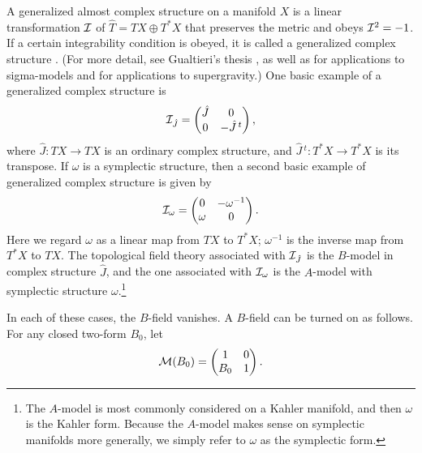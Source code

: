  A generalized
almost complex structure on a manifold $X$ is a linear
transformation ${\cal I}$ of $\widehat T=TX\oplus T^*X$ that
preserves the metric and obeys ${\cal I}^2=-1$.  If a certain
integrability condition is obeyed, it is called a generalized
complex structure \cite{ref69}.  (For more detail, see Gualtieri's
thesis \cite{ref67}, as well as \cite{ref71,ref72,ref73,ref74,ref68} for applications
to sigma-models and \cite{ref75,ref76,ref77} for applications to
supergravity.) One basic example of a generalized complex
structure is %
\setcounter{equation}{22}
\begin{equation}\label{eq:momo}
{\cal I}_{\hat J}=\left(\begin{matrix} {\hat J} &
0 \\ 0 & -{\hat J}\,^t\\\end{matrix}\right),
\end{equation}
 where ${\hat J}:TX\to TX$ is
an ordinary complex structure, and ${\hat J}\,^t:T^*X\to T^*X$ is
its transpose.  If $\omega$ is a symplectic structure, then a
second basic example of generalized complex structure is given by
\setcounter{equation}{23}
\begin{equation}\label{eq:zomo}
{\cal I}_\omega=\left(\begin{matrix}0 & -\omega^{-1}\\ \omega
& 0\\\end{matrix}\right).
\end{equation}
 Here we regard $\omega$ as a linear map from $TX$
to $T^*X$; $\omega^{-1}$ is the inverse map from $T^*X$ to $TX$.
The topological field theory associated with ${\cal I}_{\hat J}$
is the $B$-model in complex structure ${\hat J}$, and the one
associated with ${\cal I}_\omega$ is the $A$-model with symplectic
structure $\omega$.\footnote{The $A$-model is most commonly considered
on a Kahler manifold, and then $\omega$ is the Kahler form.
Because the $A$-model makes sense on symplectic manifolds more
generally, we simply refer to $\omega$ as the symplectic form.}

In each of these cases, the $B$-field vanishes.  A $B$-field can
be turned on as follows.  For any closed two-form $B_0$, let
\setcounter{equation}{24}
\begin{equation}\label{eq:hyt}
{\cal M}(B_0)=\left(\begin{matrix}1 & 0 \\
                                   B_0 & 1 \\\end{matrix}\right).
\end{equation}

